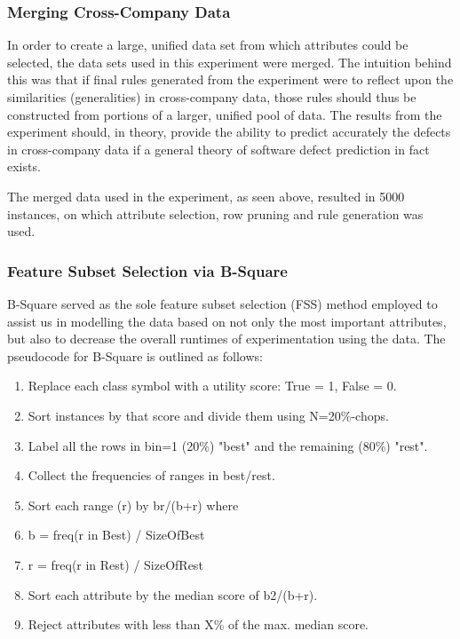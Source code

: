 \documentclass{sig-alternate}
\begin{document}
\subsubsection{Merging Cross-Company Data}

In order to create a large, unified data set from which attributes could be selected, the data sets used in this experiment were merged. The intuition behind this was that if final rules generated from the experiment were to reflect upon the similarities (generalities) in cross-company data, those rules should thus be constructed from portions of a larger, unified pool of data. The results from the experiment should, in theory, provide the ability to predict accurately the defects in cross-company data if a general theory of software defect prediction in fact exists.

The merged data used in the experiment, as seen above, resulted in 5000 instances, on which attribute selection, row pruning and rule generation was used.

\subsubsection{Feature Subset Selection via B-Square}

B-Square served as the sole feature subset selection (FSS) method employed to assist us in modelling the data based on not only the most important attributes, but also to decrease the overall runtimes of experimentation using the data. The pseudocode for B-Square is outlined as follows:

\begin{centering}
\begin{enumerate}
\item Replace each class symbol with a utility score: True = 1, False = 0.
\item Sort instances by that score and divide them using N=20\%-chops.
\item Label all the rows in bin=1 (20\%) "best" and the remaining (80\%) "rest".
\item Collect the frequencies of ranges in best/rest.
\item Sort each range (r) by b^^2/(b+r) where
\item b = freq(r in Best) / SizeOfBest
\item r = freq(r in Rest) / SizeOfRest
\item Sort each attribute by the median score of b2/(b+r).
\item Reject attributes with less than X\% of the max. median score. 
\end{enumerate}
\end{centering}
\end{document}
